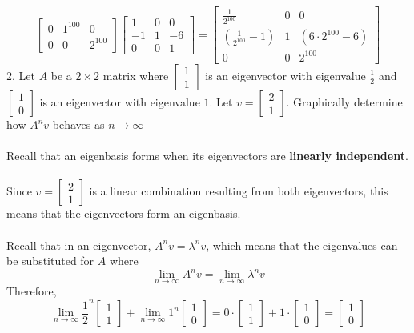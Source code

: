 \begin{enumerate}
\[\begin{bmatrix}
  0 & 1^{100} & 0 \\ 0 & 0 & 2^{100} \end{bmatrix} \begin{bmatrix}
  1 & 0 & 0 \\ -1 & 1 & -6 \\ 0 & 0 & 1 \end{bmatrix} = 
    \begin{bmatrix} \frac{1}{2^{100}} & 0 & 0 \\ 
      (\frac{1}{2^{100}} - 1) & 1 & (6 \cdot 2^{100} - 6) \\
    0 & 0 & 2^{100} \end{bmatrix}
\]
2. Let $A$ be a $2 \times 2$ matrix where $\begin{bmatrix} 1 \\ 1 
\end{bmatrix}$ is an eigenvector with eigenvalue $\frac{1}{2}$ and  
$\begin{bmatrix} 1 \\ 0 \end{bmatrix}$ is an eigenvector with 
eigenvalue $1$. Let $v = \begin{bmatrix} 2 \\ 1 \end{bmatrix}$. 
Graphically determine how $A^{n}v$ behaves as $n \rightarrow \infty$ \\\\Recall that an eigenbasis forms when its eigenvectors are \textbf{linearly independent}. \\\\ 
Since $v = \begin{bmatrix} 2 \\ 1 \end{bmatrix}$ is a linear combination 
resulting from both eigenvectors, this means that the eigenvectors 
form an eigenbasis. \\\\
Recall that in an eigenvector, 
$A^n v = \lambda^n v$, 
which means that the eigenvalues can be substituted for $A$ where 
\[
  \lim_{n \rightarrow \infty} A^n v = \lim_{n \rightarrow \infty}
  \lambda^n v 
\]
Therefore,
\[
  \lim_{n \rightarrow \infty} \frac{1}{2}^n \begin{bmatrix} 1 \\ 1 
    \end{bmatrix} + \lim_{n \rightarrow \infty} 1^n \begin{bmatrix} 1 
    \\ 0 \end{bmatrix} = 0 \cdot \begin{bmatrix} 1 \\ 1 \end{bmatrix} 
    + 1 \cdot \begin{bmatrix} 1 \\ 0 \end{bmatrix} = 
    \begin{bmatrix} 1 \\ 0 \end{bmatrix}
\]

\end{enumerate}
